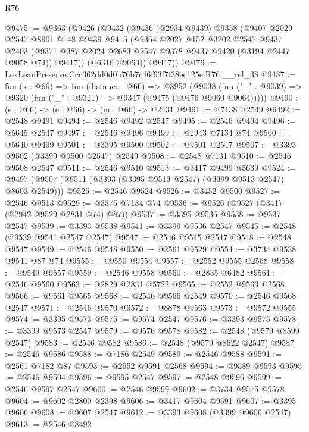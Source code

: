 \begin{lexlean}{R76}
\begin{coremodule}
@9475 := @9363
    (@9426
      (@9432
        (@9436
          (@2934 @9439)
          @9358
          (@9407
            @2029
            @2547
            @8901
            @148
            @9439
            @9415
            (@9364
              @2027
              @152
              @3202
              @2547
              @9437
              @2403
              (@9371 @387 @2024 @2683 @2547 @9378 @9437 @9420 (@3194 @2447 @9058 @74))
              @9417))
          (@6316 @9063))
        @9417))
@9476 := LexLeanPreserve.Ccc362dd0d0b76b7c46f93f7f38ec125e.R76.__rel_38
@9487 := fun (x : @66) =>
  fun (distance : @66) =>
  @8952
    (@9038 (fun ("_" : @9039) => @9320 (fun ("_" : @9321) => @9347 (@9475 (@9476 @9060 @9064)))))
@9490 := (s : @66) -> (e : @66) -> (m : @66) -> @2431
@9491 := @7138 @2549
@9492 := @2548 @9491
@9494 := @2546 @9492 @2547
@9495 := @2546 @9494
@9496 := @5645 @2547
@9497 := @2546 @9496
@9499 := @2943 @7134 @74
@9500 := @5640 @9499
@9501 := @3395 @9500
@9502 := @9501 @2547
@9507 := @3393 @9502 (@3399 @9500 @2547) @2549
@9508 := @2548 @7131
@9510 := @2546 @9508 @2547
@9511 := @2546 @9510
@9513 := @3417 @9499 @5639
@9524 := @9497 (@9507 (@9511 (@3393 (@3395 @9513 @2547) (@3399 @9513 @2547) @8603 @2549)))
@9525 := @2546 @9524
@9526 := @3452 @9500
@9527 := @2546 @9513
@9529 := @3375 @7134 @74
@9536 := @9526 (@9527 (@3417 (@2942 @9529 @2831 @74) @87))
@9537 := @3395 @9536
@9538 := @9537 @2547
@9539 := @3393 @9538
@9541 := @3399 @9536 @2547
@9545 := @2548 (@9539 @9541 @2547 @2547)
@9547 := @2546 @9545 @2547
@9548 := @2548 @9547
@9549 := @2546 @9548
@9550 := @2561 @9529
@9554 := @3734 @9538 @9541 @87 @74
@9555 := @9550 @9554
@9557 := @2552 @9555 @2568
@9558 := @9549 @9557
@9559 := @2546 @9558
@9560 := @2835 @6482
@9561 := @2546 @9560
@9563 := @2829 @2831 @5722
@9565 := @2552 @9563 @2568
@9566 := @9561 @9565
@9568 := @2546 @9566 @2549
@9570 := @2546 @9568 @2547
@9571 := @2546 @9570
@9572 := @8878 @9563
@9573 := @9572 @9555
@9574 := @3395 @9573
@9575 := @9574 @2547
@9576 := @3393 @9575
@9578 := @3399 @9573 @2547
@9579 := @9576 @9578
@9582 := @2548 (@9579 @8599 @2547)
@9583 := @2546 @9582
@9586 := @2548 (@9579 @8622 @2547)
@9587 := @2546 @9586
@9588 := @7186 @2549
@9589 := @2546 @9588
@9591 := @2561 @7182 @87
@9593 := @2552 @9591 @2568
@9594 := @9589 @9593
@9595 := @2546 @9594
@9596 := @9595 @2547
@9597 := @2548 @9596
@9599 := @2546 @9597 @2547
@9600 := @2546 @9599
@9602 := @3734 @9575 @9578
@9604 := @9602 @2800 @2398
@9606 := @3417 @9604 @9591
@9607 := @3395 @9606
@9608 := @9607 @2547
@9612 := @3393 @9608 (@3399 @9606 @2547)
@9613 := @2546 @8492

\end{coremodule}
\end{lexlean}
